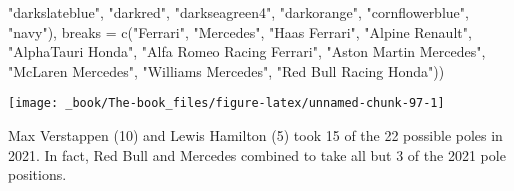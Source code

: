 \documentclass[
]{book}
\newenvironment{Shaded}{\begin{snugshade}}{\end{snugshade}}
\newcommand{\AttributeTok}[1]{\textcolor[rgb]{0.77,0.63,0.00}{#1}}
\newcommand{\FunctionTok}[1]{\textcolor[rgb]{0.00,0.00,0.00}{#1}}
\newcommand{\NormalTok}[1]{#1}
\newcommand{\StringTok}[1]{\textcolor[rgb]{0.31,0.60,0.02}{#1}}
\begin{document}
\begin{Shaded}
\begin{Highlighting}[]
                               \StringTok{"darkslateblue"}\NormalTok{, }
                                \StringTok{"darkred"}\NormalTok{,  }
                                \StringTok{"darkseagreen4"}\NormalTok{, }
                                \StringTok{"darkorange"}\NormalTok{, }
                                \StringTok{"cornflowerblue"}\NormalTok{,}
                               \StringTok{"navy"}\NormalTok{),}
                     \AttributeTok{breaks =} \FunctionTok{c}\NormalTok{(}\StringTok{"Ferrari"}\NormalTok{,}
                                 \StringTok{"Mercedes"}\NormalTok{,}
                                 \StringTok{"Haas Ferrari"}\NormalTok{,}
                                 \StringTok{"Alpine Renault"}\NormalTok{,}
                                 \StringTok{"AlphaTauri Honda"}\NormalTok{,}
                                 \StringTok{"Alfa Romeo Racing Ferrari"}\NormalTok{, }
                                 \StringTok{"Aston Martin Mercedes"}\NormalTok{,}
                                 \StringTok{"McLaren Mercedes"}\NormalTok{,}
                                 \StringTok{"Williams Mercedes"}\NormalTok{,}
                                 \StringTok{"Red Bull Racing Honda"}\NormalTok{))}
\end{Highlighting}
\end{Shaded}

\begin{center}\texttt{[image: \_book/The-book\_files/figure-latex/unnamed-chunk-97-1]} \end{center}

Max Verstappen (10) and Lewis Hamilton (5) took 15 of the 22 possible poles in 2021. In fact, Red Bull and Mercedes combined to take all but 3 of the 2021 pole positions.
\end{document}
